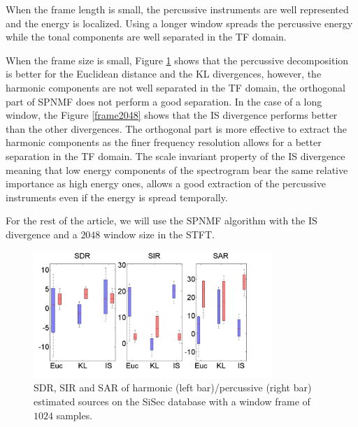 \documentclass[journal]{IEEEtran}
\begin{document}
When the frame length is small, the percussive instruments are well represented and the energy is localized. Using a longer window spreads the percussive energy while the tonal components are well separated in the TF domain.

When the frame size is small, Figure \ref{frame1024} shows that the percussive decomposition is better for the Euclidean distance and the KL divergences, however, the harmonic components are not well separated in the TF domain, the orthogonal part of SPNMF does not perform a good separation.  
In the case of a long window, the Figure \ref{frame2048} shows that the IS divergence performs better than the other divergences. The orthogonal part is more effective to extract the harmonic components as the finer frequency resolution allows for a better separation in the TF domain. The scale invariant property of the IS divergence meaning that low energy components of the spectrogram bear the same relative importance as high energy ones, allows a good extraction of the percussive instruments even if the energy is spread temporally.


For the rest of the article, we will use the SPNMF algorithm with the IS divergence and a $2048$ window size in the STFT.


\begin{figure}[htb]

  \centering 
  \includegraphics[width=9cm]{fig/DivergenceFrame1024.png}
  \caption{\label{frame1024} SDR, SIR and SAR of harmonic (left bar)/percussive (right bar) estimated sources on the SiSec database with a window frame of $1024$ samples.}
  
\end{figure}
\end{document}
